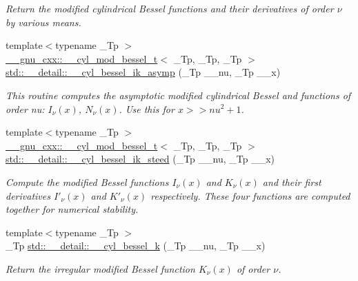 \begin{DoxyCompactItemize}
\begin{DoxyCompactList}\small\item\em Return the modified cylindrical Bessel functions and their derivatives of order $ \nu $ by various means. \end{DoxyCompactList}\item 
{\footnotesize template$<$typename \+\_\+\+Tp $>$ }\\\hyperlink{struct____gnu__cxx_1_1____cyl__mod__bessel__t}{\+\_\+\+\_\+gnu\+\_\+cxx\+::\+\_\+\+\_\+cyl\+\_\+mod\+\_\+bessel\+\_\+t}$<$ \+\_\+\+Tp, \+\_\+\+Tp, \+\_\+\+Tp $>$ \hyperlink{namespacestd_1_1____detail_a9f88b1d2b4158cc854a91a5ae7b4168d}{std\+::\+\_\+\+\_\+detail\+::\+\_\+\+\_\+cyl\+\_\+bessel\+\_\+ik\+\_\+asymp} (\+\_\+\+Tp \+\_\+\+\_\+nu, \+\_\+\+Tp \+\_\+\+\_\+x)
\begin{DoxyCompactList}\small\item\em This routine computes the asymptotic modified cylindrical Bessel and functions of order nu\+: $ I_{\nu}(x) $, $ N_{\nu}(x) $. Use this for $ x >> nu^2 + 1 $. \end{DoxyCompactList}\item 
{\footnotesize template$<$typename \+\_\+\+Tp $>$ }\\\hyperlink{struct____gnu__cxx_1_1____cyl__mod__bessel__t}{\+\_\+\+\_\+gnu\+\_\+cxx\+::\+\_\+\+\_\+cyl\+\_\+mod\+\_\+bessel\+\_\+t}$<$ \+\_\+\+Tp, \+\_\+\+Tp, \+\_\+\+Tp $>$ \hyperlink{namespacestd_1_1____detail_a0995aa3ea71e25f413e73c07f6b47542}{std\+::\+\_\+\+\_\+detail\+::\+\_\+\+\_\+cyl\+\_\+bessel\+\_\+ik\+\_\+steed} (\+\_\+\+Tp \+\_\+\+\_\+nu, \+\_\+\+Tp \+\_\+\+\_\+x)
\begin{DoxyCompactList}\small\item\em Compute the modified Bessel functions $ I_\nu(x) $ and $ K_\nu(x) $ and their first derivatives $ I'_\nu(x) $ and $ K'_\nu(x) $ respectively. These four functions are computed together for numerical stability. \end{DoxyCompactList}\item 
{\footnotesize template$<$typename \+\_\+\+Tp $>$ }\\\+\_\+\+Tp \hyperlink{namespacestd_1_1____detail_ac9152f2369a18aa795fe24ccfa6dcf12}{std\+::\+\_\+\+\_\+detail\+::\+\_\+\+\_\+cyl\+\_\+bessel\+\_\+k} (\+\_\+\+Tp \+\_\+\+\_\+nu, \+\_\+\+Tp \+\_\+\+\_\+x)
\begin{DoxyCompactList}\small\item\em Return the irregular modified Bessel function $ K_{\nu}(x) $ of order $ \nu $. \end{DoxyCompactList}\item 

\end{DoxyCompactItemize}
